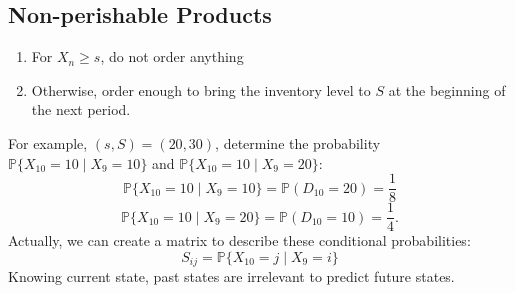 \subsection{Non-perishable Products}
\begin{enumerate}
\item
For $X_n\ge s$, do not order anything
\item
Otherwise, order enough to bring the inventory level to $S$ at the beginning of the next period.
\end{enumerate}
For example, $(s,S) = (20,30)$, determine the probability $\mathbb{P}\{X_10=10\mid X_9=10\}$ and $\mathbb{P}\{X_10=10\mid X_9=20\}$:
\[
\mathbb{P}\{X_{10}=10\mid X_9={10}\} = \mathbb{P}(D_{10}=20)=\frac{1}{8}
\]
\[
\mathbb{P}\{X_{10}=10\mid X_9=20\}
=
\mathbb{P}(D_{10} = 10) = \frac{1}{4}.
\]
Actually, we can create a matrix to describe these conditional probabilities:
\[
S_{ij} = \mathbb{P}\{X_{10} = j \mid X_9 = i\}
\]
Knowing current state, past states are irrelevant to predict future states. 









